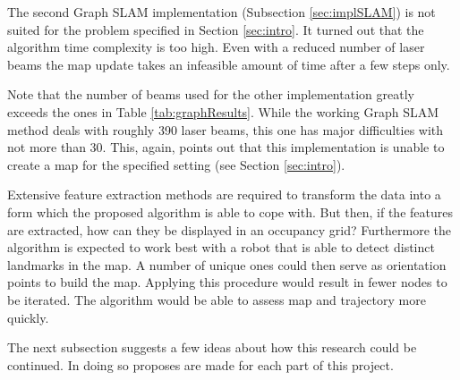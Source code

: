 \documentclass{ba-kecs}
\begin{document}
The second Graph SLAM implementation \cite{Thrun} (Subsection \ref{sec:implSLAM}) is not suited for the problem specified in Section \ref{sec:intro}.
It turned out that the algorithm time complexity is too high. Even with a reduced number of laser beams the map update takes an infeasible amount of time after a few steps only. 

\begin{table}[h]
\begin{center}
\end{center}
\caption{The time the Graph SLAM implementation proposed by \citep{Thrun} needed using the specified number of laser beams after the specified number of steps.}
\label{tab:graphResults}
\end{table}

Note that the number of beams used for the other implementation greatly exceeds the ones in Table \ref{tab:graphResults}. While the working Graph SLAM method deals with roughly 390 laser beams, this one has major difficulties with not more than 30.
This, again, points out that this implementation is unable to create a map for the specified setting (see Section \ref{sec:intro}).

Extensive feature extraction methods are required to transform the data into a form which the proposed algorithm is able to cope with. But then, if the features are extracted, how can they be displayed in an occupancy grid? Furthermore the algorithm is expected to work best with a robot that is able to detect distinct landmarks in the map. A number of unique ones could then serve as orientation points to build the map. Applying this procedure would result in fewer nodes to be iterated. The algorithm would be able to assess map and trajectory more quickly.

The next subsection suggests a few ideas about how this research could be continued. In doing so proposes are made for each part of this project.
\end{document}
